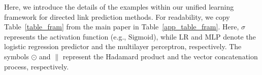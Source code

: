 
Here, we introduce the details of the examples within our unified learning framework for directed link prediction methods. For readability, we copy Table~\ref{table_fram} from the main paper in Table~\ref{app_table_fram}. Here, $\sigma$ represents the activation function (e.g., $\mathrm{Sigmoid}$), while $\mathrm{LR}$ and $\mathrm{MLP}$ denote the logistic regression predictor and the multilayer perceptron, respectively. The symbols $\odot$ and $\|$ represent the Hadamard product and the vector concatenation process, respectively.

